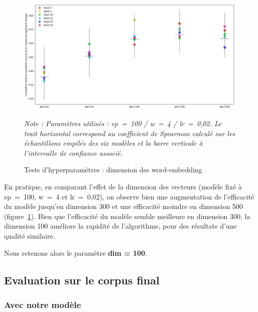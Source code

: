 \documentclass[11pt,french,french]{article}
\begin{document}
\begin{figure}
\begin{center}
\includegraphics[width=1\textwidth]{img/test_parametres2.png}
\captionsetup{margin=0cm,format=hang,justification=justified}
\caption{Tests d'hyperparamètres : dimension des word-embedding}\label{fig:figure_dim}
\end{center}
\vspace{-0.3cm}
\footnotesize
\emph{Note : Paramètres utilisés : ep = 100 / w = 4 / lr = 0,02.\newline
Le trait horizontal correspond au coefficient de Spearman calculé sur les échantillons empilés des six modèles et la barre verticale à l'intervalle de confiance associé.}
\end{figure}

En pratique, en comparant l'effet de la dimension des vecteurs (modèle fixé à ep~=~100, w~=~4 et lr~=~0,02), on observe bien une augmentation de l'efficacité du modèle jusqu'en dimension 300 et une efficacité moindre en dimension 500 (figure~\ref{fig:figure_dim}). Bien que l'efficacité du modèle semble meilleure en dimension 300, la dimension 100 améliore la rapidité de l'algorithme, pour des résultats d'une qualité similaire.

\faArrowCircleRight{} Nous retenons alors le paramètre \textbf{dim = 100}.

\hypertarget{evaluation-sur-le-corpus-final}{%
\subsection{Evaluation sur le corpus final}\label{evaluation-sur-le-corpus-final}}

\hypertarget{avec-notre-moduxe8le}{%
\subsubsection{\texorpdfstring{Avec \og notre \fg{} modèle}{Avec notre  modèle}}\label{avec-notre-moduxe8le}}
\end{document}

